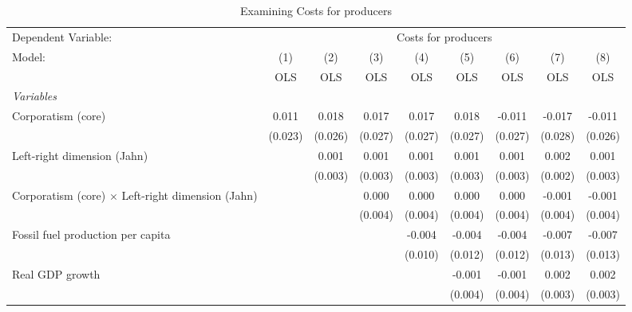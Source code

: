 
\begin{table}[htbp]
   \caption{Examining Costs for producers}
   \centering
   \begin{tabular}{lcccccccc}
      \toprule
      Dependent Variable: & \multicolumn{8}{c}{Costs for producers}\\
      Model:                                                   & (1)     & (2)     & (3)     & (4)     & (5)     & (6)     & (7)     & (8)\\  
                                                               &  OLS    & OLS     & OLS     & OLS     & OLS     & OLS     & OLS     & OLS\\  
      \midrule
      \emph{Variables}\\
      Corporatism (core)                                       & 0.011   & 0.018   & 0.017   & 0.017   & 0.018   & -0.011  & -0.017  & -0.011\\   
                                                               & (0.023) & (0.026) & (0.027) & (0.027) & (0.027) & (0.027) & (0.028) & (0.026)\\   
      Left-right dimension (Jahn)                              &         & 0.001   & 0.001   & 0.001   & 0.001   & 0.001   & 0.002   & 0.001\\   
                                                               &         & (0.003) & (0.003) & (0.003) & (0.003) & (0.003) & (0.002) & (0.003)\\   
      Corporatism (core) $\times$ Left-right dimension (Jahn)  &         &         & 0.000   & 0.000   & 0.000   & 0.000   & -0.001  & -0.001\\   
                                                               &         &         & (0.004) & (0.004) & (0.004) & (0.004) & (0.004) & (0.004)\\   
      Fossil fuel production per capita                        &         &         &         & -0.004  & -0.004  & -0.004  & -0.007  & -0.007\\   
                                                               &         &         &         & (0.010) & (0.012) & (0.012) & (0.013) & (0.013)\\   
      Real GDP growth                                          &         &         &         &         & -0.001  & -0.001  & 0.002   & 0.002\\   
                                                               &         &         &         &         & (0.004) & (0.004) & (0.003) & (0.003)\\   

\end{tabular}
\end{table}
